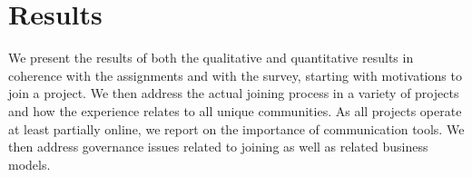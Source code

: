 \section{Results}

We present the results of both the qualitative and quantitative results  in coherence with the assignments and with the survey, starting with motivations to join a project. We then address the actual joining process in a variety of projects and how the experience relates to all unique communities. As all projects operate at least partially online, we report on the importance of communication tools. We then address governance issues related to joining as well as related business models. 





